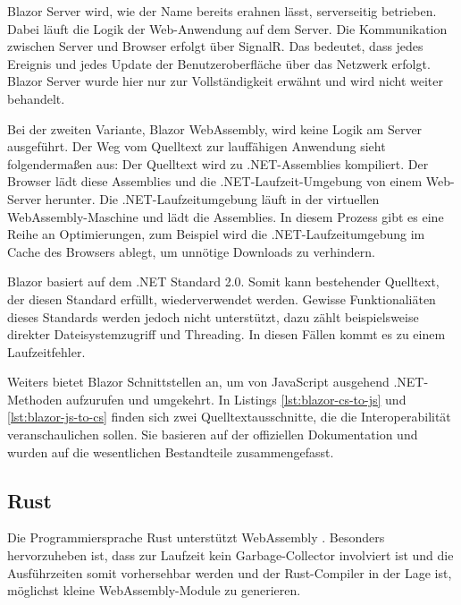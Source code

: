 Blazor Server wird, wie der Name bereits erahnen lässt, serverseitig betrieben. Dabei läuft die Logik der Web-Anwendung auf dem Server. Die Kommunikation zwischen Server und Browser erfolgt über SignalR. Das bedeutet, dass jedes Ereignis und jedes Update der Benutzeroberfläche über das Netzwerk erfolgt. Blazor Server wurde hier nur zur Vollständigkeit erwähnt und wird nicht weiter behandelt.

Bei der zweiten Variante, Blazor WebAssembly, wird keine Logik am Server ausgeführt. Der Weg vom Quelltext zur lauffähigen Anwendung sieht folgendermaßen aus: Der Quelltext wird zu .NET-Assemblies kompiliert. Der Browser lädt diese Assemblies und die .NET-Laufzeit-Umgebung von einem Web-Server herunter. Die .NET-Lauf\-zeit\-um\-ge\-bung läuft in der virtuellen WebAssembly-Maschine und lädt die Assemblies. In diesem Prozess gibt es eine Reihe an Optimierungen, zum Beispiel wird die .NET-Laufzeitumgebung im Cache des Browsers ablegt, um unnötige Downloads zu verhindern.

Blazor basiert auf dem .NET Standard 2.0. Somit kann bestehender Quelltext, der diesen Standard erfüllt, wiederverwendet werden. Gewisse Funktionaliäten dieses Standards werden jedoch nicht unterstützt, dazu zählt beispielsweise direkter Dateisystemzugriff und Threading. In diesen Fällen kommt es zu einem Laufzeitfehler.

Weiters bietet Blazor Schnittstellen an, um von JavaScript ausgehend .NET-Methoden aufzurufen und umgekehrt. In Listings \ref{lst:blazor-cs-to-js} und \ref{lst:blazor-js-to-cs} finden sich zwei Quelltextausschnitte, die die Interoperabilität veranschaulichen sollen. Sie basieren auf der offiziellen Dokumentation und wurden auf die wesentlichen Bestandteile zusammengefasst.





\subsection{Rust}

Die Programmiersprache Rust unterstützt WebAssembly \cite{RustWasmWebsite}. Besonders hervorzuheben ist, dass zur Laufzeit kein Garbage-Collector involviert ist und die Ausführzeiten somit vorhersehbar werden und der Rust-Compiler in der Lage ist, möglichst kleine Web\-As\-sem\-bly-Module zu generieren.

